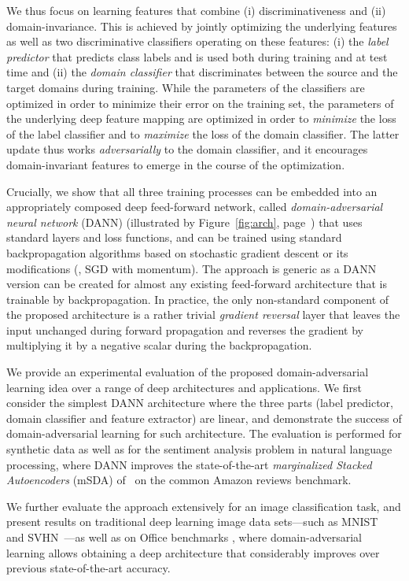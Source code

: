 \documentclass[twoside,11pt]{article}
\newcommand{\fig}[1]{Figure~\ref{fig:#1}}
\begin{document}
We thus focus on learning features that combine (i) discriminativeness and (ii) domain-invariance. This is achieved by jointly optimizing the underlying features as well as two discriminative classifiers operating on these features: (i) the \emph{label predictor} that predicts class labels and is used both during training and at test time and (ii) the \emph{domain classifier} that discriminates between the source and the target domains during training. While the parameters of the classifiers are optimized in order to minimize their error on the training set, the parameters of the underlying deep feature mapping are optimized in order to {\em minimize} the loss of the label classifier and to {\em maximize} the loss of the domain classifier. The latter update thus works \textit{adversarially} to the domain classifier, and it encourages domain-invariant features to emerge in the course of the optimization.

Crucially, we show that all three training processes can be embedded into an appropriately composed deep feed-forward network, called \textit{domain-adversarial neural network} (DANN) (illustrated by \fig{arch}, page~\pageref{fig:arch}) that uses standard layers and loss functions, and can be trained using standard backpropagation algorithms based on stochastic gradient descent or its modifications (\eg, SGD with momentum). The approach is generic as a DANN version can be created for almost any existing feed-forward architecture that is trainable by backpropagation. In practice, the only non-standard component of the proposed architecture is a rather trivial {\em gradient reversal} layer that leaves the input unchanged during forward propagation and reverses the gradient by multiplying it by a negative scalar during the backpropagation.

We provide an experimental evaluation of the proposed domain-adversarial learning idea over a range of deep architectures and applications. We first consider the simplest DANN architecture where the three parts (label predictor, domain classifier and feature extractor) are linear, and demonstrate the success of domain-adversarial learning for such architecture. The evaluation is performed for synthetic data as well as for the sentiment analysis problem in natural language processing, where DANN improves the state-of-the-art \emph{marginalized Stacked Autoencoders} (mSDA) of~\citet{Chen12} on the common Amazon reviews benchmark.


We further evaluate the approach extensively for an image classification task, and present results on traditional deep learning image data sets---such as MNIST~\citep{LeCun98} and SVHN~\citep{Netzer11}---as well as on {\sc Office} benchmarks \citep{Saenko10}, where  domain-adversarial learning allows obtaining a deep architecture that considerably improves over previous state-of-the-art accuracy. 
\end{document}

